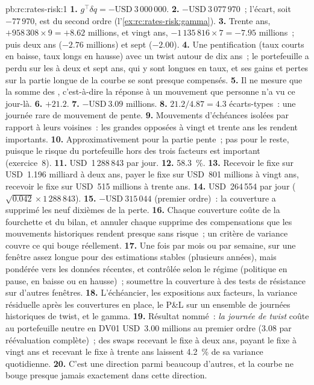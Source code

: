 \begin{solution}{pb:rc:rates-risk:1}
\textbf{1.} $g^\top\delta q = -\text{USD}~3\,000\,000$.
\textbf{2.} $-\text{USD}~3\,077\,970$~; l'écart, soit $-77\,970$, est du second ordre
(l'\cref{ex:rc:rates-risk:gamma}).
\textbf{3.} Trente ans, $+958\,308\times9 = +8.62$ millions, et vingt ans,
$-1\,135\,816\times7 = -7.95$ millions~; puis deux ans ($-2.76$ millions) et sept
($-2.00$).
\textbf{4.} Une pentification (taux courts en baisse, taux longs en hausse) avec un twist autour de dix ans~;
le portefeuille a perdu sur les  à deux et sept ans, qui y sont
longues en taux, et ses gains et pertes sur la partie longue de la courbe se sont presque compensés.
\textbf{5.} Il ne mesure que la somme des , c'est-à-dire la réponse à un mouvement que personne
n'a vu ce jour-là.
\textbf{6.} $+21.2$.
\textbf{7.} $-\text{USD}~3.09$ millions.
\textbf{8.} $21.2/4.87 = 4.3$ écarts-types~: une journée rare de mouvement de pente.
\textbf{9.} Mouvements d'échéances isolées par rapport à leurs voisines~: les
grandes  opposées à vingt et trente ans les rendent importants.
\textbf{10.} Approximativement pour la partie pente~; pas pour le reste, puisque le risque du
portefeuille hors des trois facteurs est important (exercice~8).
\textbf{11.} USD~1\,288\,843 par jour.
\textbf{12.} 58.3~\%.
\textbf{13.} Recevoir le fixe sur USD~1.196 milliard à deux ans, payer le fixe sur USD~801
millions à vingt ans, recevoir le fixe sur USD~515 millions à trente ans.
\textbf{14.} USD~264\,554 par jour ($\sqrt{0.042}\times1\,288\,843$).
\textbf{15.} $-\text{USD}~315\,044$ (premier ordre)~: la couverture a supprimé les neuf dixièmes
de la perte.
\textbf{16.} Chaque couverture coûte de la fourchette et du bilan, et annuler chaque 
supprime des compensations que les mouvements historiques rendent presque sans risque~; un critère
de variance couvre ce qui bouge réellement.
\textbf{17.} Une fois par mois ou par semaine, sur une fenêtre assez longue pour des estimations stables
(plusieurs années), mais pondérée vers les données récentes, et contrôlée selon le
régime (politique en pause, en baisse ou en hausse)~; soumettre la couverture à des tests de résistance sur d'autres fenêtres.
\textbf{18.} L'échéancier, les expositions aux facteurs, la variance résiduelle après les
couvertures en place, le P\&L sur un ensemble de journées historiques de twist, et le gamma.
\textbf{19.} Résultat nommé~: \emph{la journée de twist} coûte au portefeuille neutre en DV01 USD~3.00
millions au premier ordre (3.08 par réévaluation complète)~; des swaps recevant le fixe à deux ans, payant
le fixe à vingt ans et recevant le fixe à trente ans laissent 4.2~\% de sa variance quotidienne.
\textbf{20.} C'est une direction parmi beaucoup d'autres, et la courbe ne bouge presque jamais
exactement dans cette direction.
\end{solution}

